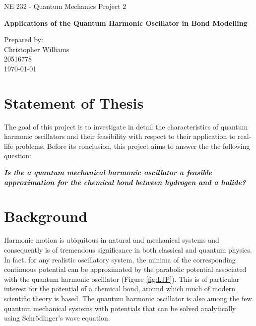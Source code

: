 \documentclass[11pt]{article}
\begin{document}
\begin{titlepage}
	\begin{center}
		\Large
		
		NE 232 - Quantum Mechanics Project 2\\
		\vfill
		
		\textbf{Applications of the Quantum Harmonic Oscillator in Bond Modelling}
		
		\vfill
		
					
		
		Prepared by:\\
		Christopher Williams\\
		20516778\\
		\today\\
		
	\end{center}
\end{titlepage}

\setlength{\baselineskip}{20pt}

\section{Statement of Thesis}
The goal of this project is to investigate in detail the characteristics of quantum harmonic oscillators and their feasibility with respect to their application to real-life problems. Before its conclusion, this project aims to answer the the following question:
\begin{center}
\textit{\textbf{Is the a quantum mechanical harmonic oscillator a feasible approximation for the chemical bond between hydrogen and a halide? }}
\end{center}

\section{Background}
Harmonic motion is ubiquitous in natural and mechanical systems and consequently is of tremendous significance in both classical and quantum physics. In fact, for any realistic oscillatory system, the minima of the corresponding continuous potential can be approximated by the parabolic potential associated with the quantum harmonic oscillator (Figure \ref{fig:LJP}). This is of particular interest for the potential of a chemical bond, around which much of modern scientific theory is based. The quantum harmonic oscillator is also among the few quantum mechanical systems with potentials that can be solved analytically using Schr\"{o}dinger's wave equation.
 
\end{document}
